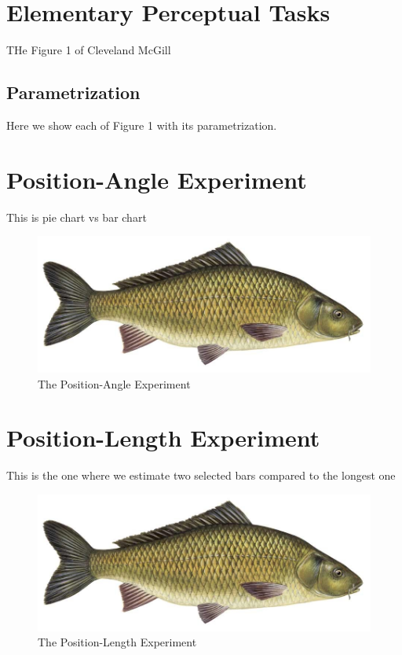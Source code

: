 \documentclass[journal]{vgtc}                %
\begin{document}
\section{Elementary Perceptual Tasks}

THe Figure 1 of Cleveland McGill

\subsection{Parametrization}

Here we show each of Figure 1 with its parametrization.


\section{Position-Angle Experiment}

This is pie chart vs bar chart

\begin{figure}[t]
	  \includegraphics[width=\linewidth]{fish.jpg}
  \caption{The Position-Angle Experiment}
	\label{fig:position_angle_experiment}
\end{figure}

\section{Position-Length Experiment}

This is the one where we estimate two selected bars compared to the longest one

\begin{figure}[t]
	  \includegraphics[width=\linewidth]{fish.jpg}
  \caption{The Position-Length Experiment}
	\label{fig:position_length_experiment}
\end{figure}
\end{document}

